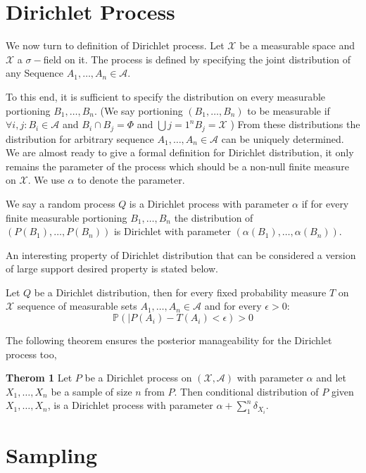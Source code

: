 \documentclass{article}
\begin{document}
\section{Dirichlet Process}
We now turn to definition of Dirichlet process. Let $ \mathcal{X}$  be a measurable space
and $ \mathcal{X} $  a $\sigma-$field on it. The process is defined by specifying the joint distribution of any
Sequence $A_1, \ldots, A_n \in \mathcal{A}$.

To this end, it is sufficient to specify the distribution on every measurable portioning $B_1, \ldots, B_n$.
(We say portioning $(B_1, \ldots, B_n)$ to be measurable if $\forall i,j: B_i \in \mathcal{A}$ and $B_i \cap B_j = \Phi$ and $\bigcup{j=1}^n B_j = \mathcal{X}$ )
From these distributions the distribution for arbitrary sequence $A_1, \ldots, A_n \in \mathcal{A}$ can be uniquely determined.
We are almost ready to give a formal definition for Dirichlet distribution, it only remains
the parameter of the process which should be a non-null finite measure on $\mathcal{X}$. We use $\alpha$ to denote the parameter.

We say a random process $Q$ is a Dirichlet process with parameter $\alpha$ if for every finite measurable portioning $B_1, \ldots, B_n$
the distribution of $(P(B_1), \ldots, P(B_n))$ is  Dirichlet with parameter $(\alpha(B_1), \ldots, \alpha(B_n))$.

An interesting property of Dirichlet distribution that can be considered a version of large support desired property is stated below.

Let $Q$ be a Dirichlet distribution, then for every fixed probability measure $T$ on $\mathcal{X}$ sequence of measurable sets
$A_1, \ldots, A_n \in \mathcal{A}$ and for every $\epsilon > 0$:
\begin{equation}
  \mathbb{P}(|P(A_i) - T(A_i) <\epsilon) > 0
\end{equation}

The following theorem ensures the posterior manageability for the Dirichlet process too,

\textbf{Therom 1} Let $P$ be a Dirichlet process on $(\mathcal{X},\mathcal{A})$ with parameter $\alpha $ and let $X_1,\ldots, X_n$
be a sample of size $n$ from $P$.
Then conditional distribution of $P$ given $ X_1, \ldots , X_n$, is a Dirichlet process with parameter $\alpha + \sum_{1}^n \delta_{X_i}$.





\section{Sampling}
\end{document}
